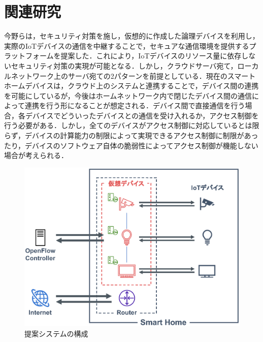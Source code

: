 \documentclass[a4paper,10pt,twocolumn,uplatex]{jsarticle}
\begin{document}
\section{関連研究}
今野らは，セキュリティ対策を施し，仮想的に作成した論理デバイスを利用し，実際のIoTデバイスの通信を中継することで，セキュアな通信環境を提供するプラットフォームを提案した\cite{logic}．これにより，IoTデバイスのリソース量に依存しないセキュリティ対策の実現が可能となる．しかし，クラウドサーバ宛て，ローカルネットワーク上のサーバ宛ての2パターンを前提としている．現在のスマートホームデバイスは，クラウド上のシステムと連携することで，デバイス間の連携を可能にしているが，今後はホームネットワーク内で閉じたデバイス間の通信によって連携を行う形になることが想定される\cite{d2d}．デバイス間で直接通信を行う場合，各デバイスでどういったデバイスとの通信を受け入れるか，アクセス制御を行う必要がある．しかし，全てのデバイスがアクセス制御に対応しているとは限らず，デバイスの計算能力の制限によって実現できるアクセス制御に制限があったり，デバイスのソフトウェア自体の脆弱性によってアクセス制御が機能しない場合が考えられる\cite{disap}．

\begin{figure}[!tb]
  \centering
  \includegraphics[width=\linewidth]{img/architecture.eps}
  \caption{提案システムの構成}
  \label{fig:architecture}
\end{figure}
\end{document}
